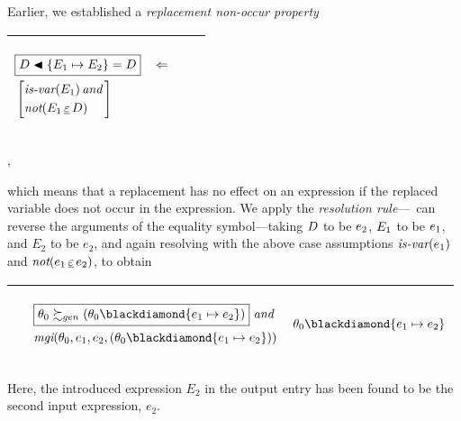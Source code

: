 \documentclass[runningheads]{llncs}
\DeclareMathOperator{\uand}{\emph{and}\,}
\DeclareMathOperator{\unot}{\emph{not}\kern-.0pt}
\DeclareMathOperator{\uimpliedby}{\Leftarrow}
\DeclareMathOperator{\isvar}{\emph{is-var}}
\DeclareMathOperator{\mgi}{\emph{mgi}}
\begin{document}
Earlier, we established a \emph{replacement non-occur property}
\begin{center}
  \begin{tabular}{|m{}|m{}||m{}|}
\hline
\begin{center}
$
\begin{aligned}
&\boxed{\var{D} \apply \{\E{1} \mapsto \E{2} \} = \var{D}} \quad \uimpliedby \\
&\left[\begin{aligned}  
&\!\isvar(\E{1}) \uand \\
&\!\unot(\E{1} \occurseq \var{D})
\end{aligned}\right]
\end{aligned}
$
\end{center}& &  \\  \hline
\end{tabular},
\end{center}
which means that a replacement has no effect on an expression if the replaced variable does not occur in the expression.  We apply the \emph{resolution rule}---\SNARK\ can reverse the arguments of the equality symbol---taking $D$ to be $e_{2}$, $E_{1}$ to be $e_{1}$, and $E_2$ to be $e_2$, and again resolving with the above case assumptions $\isvar(\e{1})$ and $\unot(\e{1} \occurseq \e{2})$,  to obtain
\begin{center}
\begin{tabular}{|m{}|m{}||m{}|}
 \hline 
  &\begin{center} 
$
\begin{aligned}
&     \boxed{\thet{0} \moregen (\thet{0} \compose \{\e{1} \mapsto  \e{2}\})} \, \uand
\\
  \,\, & {\mgi}(\thet{0}, \e{1}, \e{2}, (\thet{0} \compose \{\e{1} \mapsto  \e{2}\})) \\
  \end{aligned}$
\end{center}
& 
\begin{center}$\thet{0} \compose \{\e{1} \mapsto  \e{2}\}$ \end{center}\\
\hline
\end{tabular}
\end{center}
Here, the introduced expression $E_2$ in the output entry has been found to be the second input expression, 
$e_2$.
\end{document}
